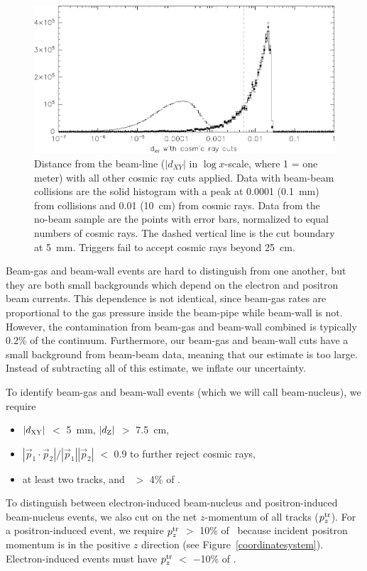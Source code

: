 \documentclass{cornell}
\begin{document}
\begin{figure}[p]
  \begin{center}
    \includegraphics[width=\linewidth]{plots/dxydzcontaminationa}
  \end{center}
  \caption[Projecting cosmic ray magnitude into accepted data using
  the no-beam sample]{\label{dxydzcontaminationa} Distance from the
  beam-line ($|d_{XY}|$ in $\log x$-scale, where 1 = one meter) with
  all other cosmic ray cuts applied.  Data with beam-beam collisions
  are the solid histogram with a peak at 0.0001 (0.1~mm) from
  collisions and 0.01 (10~cm) from cosmic rays.  Data from the no-beam
  sample are the points with error bars, normalized to equal numbers
  of cosmic rays.  The dashed vertical line is the cut boundary at
  5~mm.  Triggers fail to accept cosmic rays beyond 25~cm.}
\end{figure}

Beam-gas and beam-wall events are hard to distinguish from one
another, but they are both small backgrounds which depend on the
electron and positron beam currents.  This dependence is not
identical, since beam-gas rates are proportional to the gas pressure
inside the beam-pipe while beam-wall is not.  However, the
contamination from beam-gas and beam-wall combined is typically 0.2\%
of the continuum.  Furthermore, our beam-gas and beam-wall cuts have a
small background from beam-beam data, meaning that our estimate is too
large.  Instead of subtracting all of this estimate, we inflate our
uncertainty.

To identify beam-gas and beam-wall events (which we will call
beam-nucleus), we require
\begin{itemize}

  \item $|d_{\mbox{\scriptsize XY}}|$ $<$ 5~mm, $|d_{\mbox{\scriptsize Z}}|$ $>$ 7.5~cm,

  \item $|\vec{p}_1 \cdot \vec{p}_2| / |\vec{p}_1| |\vec{p}_2|$ $<$
    0.9 to further reject cosmic rays,

  \item at least two tracks, and \visen\ $>$ 4\% of \ecm.

\end{itemize}
To distinguish between electron-induced beam-nucleus and
positron-induced beam-nucleus events, we also cut on the net
$z$-momentum of all tracks ($p_z^{\mbox{\scriptsize tr}}$).  For a positron-induced
event, we require $p_z^{\mbox{\scriptsize tr}}$ $>$ 10\% of \ebeam\ because incident
positron momentum is in the positive $z$ direction (see Figure~\ref{coordinatesystem}).  Electron-induced events must have
$p_z^{\mbox{\scriptsize tr}}$ $<$ $-$10\% of \ebeam.
\end{document}
